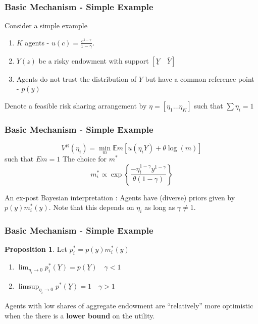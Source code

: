 \documentclass{beamer}
\theoremstyle{definition}
\newtheorem{proposition}{Proposition}%
\begin{document}


\begin{frame}
\frametitle{Basic Mechanism - Simple Example}

Consider a simple example 
\begin{enumerate}
	\item $K$ agents - $u(c)=\frac{c^{1-\gamma}}{1-\gamma}$. 
	\item $Y(z)$ be a risky endowment with support  $[\underline{Y} \quad \bar{Y}]$
\item Agents do not trust the distribution of $Y$ but have a common reference point - $p(y)$ 
\end{enumerate}

Denote a feasible risk sharing arrangement by $\eta = [\eta_1 \dots \eta_K]$ such that $\sum \eta_i=1$

\end{frame}




\begin{frame}
\frametitle{Basic Mechanism - Simple Example}
\[V^R (\eta_i)=\min_{m}\mathbb{E}m[u(\eta_iY)+\theta\log(m)]\]
such that 
$Em=1$
The choice for $m^*$
\[m_i^*\propto \exp\left\{\frac {-\eta^{1-\gamma}_iy^{1-\gamma}}{\theta(1-\gamma)}\right\}\]

An ex-post Bayesian interpretation : Agents have (diverse) priors given by $p(y)m^*_i(y)$. Note that this depends on $\eta_i$ as long as $\gamma \neq 1$.

\end{frame}


\begin{frame}
\frametitle{Basic Mechanism - Simple Example}
\begin{proposition}
Let $p^*_i=p(y)m^*_i(y)$
\label{propo-1}
\begin{enumerate}
	\item $\lim_{\eta_i \to 0} p_i^*(\underline{Y})=p(\underline{Y}) \quad \gamma < 1$
	\item $\limsup_{\eta_i \to 0} p^*(\underline{Y})=1  \quad \gamma > 1$
\end{enumerate}
\end{proposition}
Agents with low shares of aggregate endowment are ``relatively'' more optimistic when the there is a \textbf{lower bound} on the utility.
\end{frame}
\end{document}
